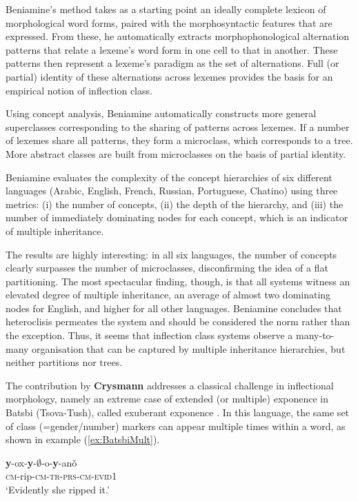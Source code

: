 \documentclass[output=paper]{langscibook}
\begin{document}
Beniamine's method takes as a starting point an ideally complete
lexicon of morphological word forms, paired with the morphosyntactic
features that are expressed. From these, he automatically extracts
morphophonological alternation patterns that relate a lexeme's  word form in
one cell to that in another. These patterns then represent a lexeme's
paradigm as the set of alternations. Full (or partial) identity of 
these alternations across lexemes provides the basis for an empirical
notion of inflection class. 

Using concept analysis, Beniamine automatically constructs more
general superclasses corresponding to the sharing of patterns across
lexemes. If a number of lexemes share all patterns, they form a
microclass, which corresponds to a tree. More abstract classes are
built from microclasses on the basis of partial identity.

Beniamine evaluates the complexity of the concept hierarchies of six
different languages (Arabic, English, French, Russian, Portuguese,
Chatino) using three metrics: (i) the number of concepts, (ii) the
depth of the hierarchy, and (iii) the number of immediately dominating
nodes for each concept, which is an indicator of multiple inheritance.

The results are highly interesting: in all six languages, the number
of concepts clearly surpasses the number of microclasses,
disconfirming the idea of a flat partitioning. The most spectacular
finding, though, is that all systems witness an elevated degree of
multiple inheritance, an average of almost two dominating nodes for
English, and higher for all other languages. Beniamine concludes that
heteroclisis permeates the system and should be considered the norm
rather than the exception. Thus, it seems that inflection class
systems observe a many-to-many organisation that can be captured by
multiple inheritance hierarchies, but neither partitions nor trees.



The contribution by \textbf{Crysmann} addresses a classical
challenge in inflectional morphology, namely an extreme case of
extended (or multiple) exponence in Batsbi (Tsova-Tush), called
exuberant exponence \citep{Harris09}. In this language, the same set
of class (=gender/number) markers can appear multiple times
within a word, as shown in example (\ref{ex:BatsbiMult}).

\begin{exe}
  \ex  \label{ex:BatsbiMult}\gll \textbf{y}-ox-\textbf{y}-$\emptyset$-o-\textbf{y}-anǒ\\
  \textsc{cm}-rip-\textsc{cm-tr-prs-cm-evid1}\\
  \glt `Evidently she ripped it.’ \hfill\citep[277]{Harris09}
  
\end{exe}
\end{document}
